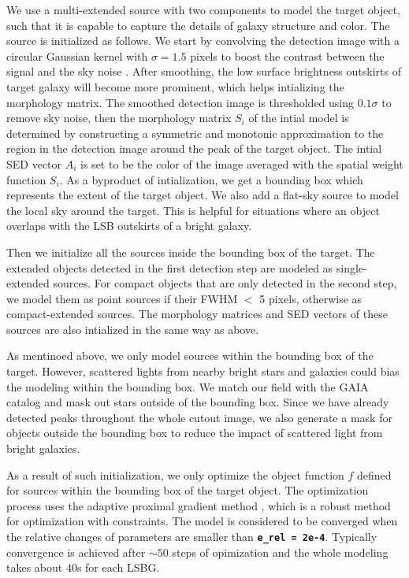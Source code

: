 \documentclass[twocolumn,astrosymb,twocolappendix]{aastex631}
\newcommand{\code}[1]{\textbf{\texttt{#1}}}
\begin{document}
\begin{CJK*}{UTF8}{gbsn}
We use a multi-extended source with two components to model the target object, such that it is capable to capture the details of galaxy structure and color. The source is initialized as follows. We start by convolving the detection image with a circular Gaussian kernel with $\sigma=1.5$ pixels to boost the contrast between the signal and the sky noise \citep[e.g.,][]{Irwin1985,Akhlaghi2015,Greco2018}. After smoothing, the low surface brightness outskirts of target galaxy will become more prominent, which helps intializing the morphology matrix. The smoothed detection image is thresholded using $0.1\sigma$ to remove sky noise, then the morphology matrix $S_i$ of the intial model is determined by constructing a symmetric and monotonic approximation to the region in the detection image around the peak of the target object. The intial SED vector $A_i$ is set to be the color of the image averaged with the spatial weight function $S_i$. As a byproduct of intialization, we get a bounding box which represents the extent of the target object. We also add a flat-sky source to model the local sky around the target. This is helpful for situations where an object overlaps with the LSB outskirts of a bright galaxy.

Then we initialize all the sources inside the bounding box of the target. The extended objects detected in the first detection step are modeled as single-extended sources. For compact objects that are only detected in the second step, we model them as point sources if their FWHM $<$ 5 pixels, otherwise as compact-extended sources. The morphology matrices and SED vectors of these sources are also intialized in the same way as above. 

As mentinoed above, we only model sources within the bounding box of the target. However, scattered lights from nearby bright stars and galaxies could bias the modeling within the bounding box. We match our field with the GAIA catalog and mask out stars outside of the bounding box. Since we have already detected peaks throughout the whole cutout image, we also generate a mask for objects outside the bounding box to reduce the impact of scattered light from bright galaxies. 

As a result of such initialization, we only optimize the object function $f$ defined for sources within the bounding box of the target object. The optimization process uses the adaptive proximal gradient method \citep{Melchior2019}, which is a robust method for optimization with constraints. The model is considered to be converged when the relative changes of parameters are smaller than \code{e\_rel\,=\,2e-4}. Typically convergence is achieved after $\sim 50$ steps of opimization and the whole modeling takes about 40s for each LSBG. 


\end{CJK*}
\end{document}
